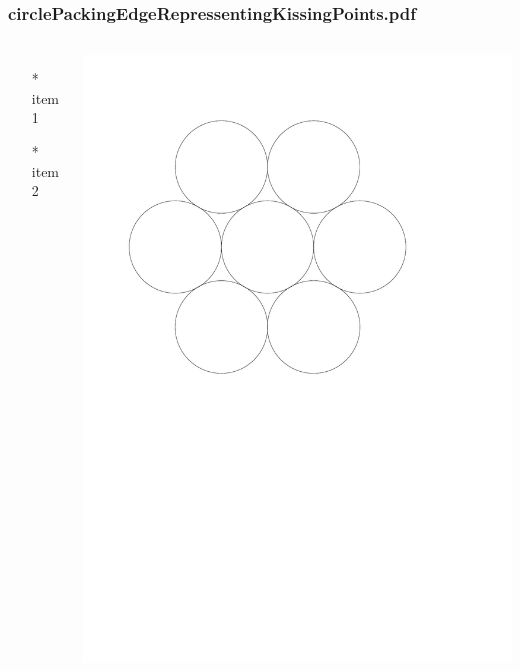 \begin{frame} \frametitle{circlePackingEdgeRepressentingKissingPoints.pdf}
    \begin{columns}[c]
        \begin{itemize}
            \item[*] item 1
            \item[*] item 2
        \end{itemize}
        \begin{minipage}{\linewidth}
            \begin{center}
            \includegraphics[width=.9\textwidth]{graphics/circlePackingEdgeRepressentingKissingPoints.pdf}
            \label{gfx:circlePackingEdgeRepressentingKissingPoints.pdf}
            \end{center}
        \end{minipage}
    \end{columns}
\end{frame}
